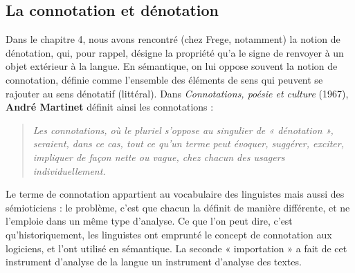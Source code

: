 \subsection{La connotation et dénotation}
Dans le chapitre 4, nous avons rencontré (chez Frege, notamment) la notion de dénotation, qui, pour rappel, désigne la propriété qu’a le signe de renvoyer à un objet extérieur à la langue. En sémantique, on lui oppose souvent la notion de connotation, définie comme l’ensemble des éléments de sens qui peuvent se rajouter au sens dénotatif (littéral). Dans \textit{Connotations, poésie et culture} (1967), \textbf{André Martinet} définit ainsi les connotations :
\begin{quote}\small\itshape
Les connotations, où le pluriel s’oppose au singulier de « dénotation », seraient, dans ce cas, tout ce qu’un terme peut évoquer, suggérer, exciter, impliquer de façon nette ou vague, chez chacun des usagers individuellement.
\end{quote}
Le terme de connotation appartient au vocabulaire des linguistes mais aussi des sémioticiens : le problème, c’est que chacun la définit de manière différente, et ne l’emploie dans un même type d’analyse. Ce que l’on peut dire, c’est qu’historiquement, les linguistes ont emprunté le concept de connotation aux logiciens, et l’ont utilisé en sémantique. La seconde « importation » a fait de cet instrument d’analyse de la langue un instrument d’analyse des textes.

